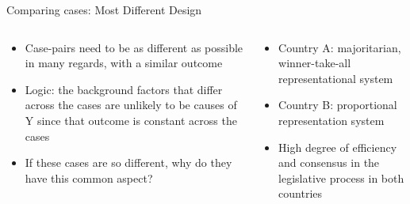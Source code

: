 \documentclass[10pt, aspectratio=169]{beamer}
\begin{document}
    
\begin{frame}{Comparing cases: Most Different Design}
    \begin{columns}
        \begin{column}{0.5\textwidth}
            \begin{itemize}
                \item Case-pairs need to be as different as possible in many regards, with a similar outcome\vspace{0.3cm}
                \item Logic: the background factors that differ across the cases are unlikely to be causes of Y since that outcome is constant across the cases\vspace{0.3cm}
                \item If these cases are so different, why do they have this common aspect?
            \end{itemize}
        \end{column}
        \vline
        \begin{column}{0.5\textwidth}
            \begin{itemize}
                \item Country A: majoritarian, winner-take-all representational system\vspace{0.3cm}
                \item Country B: proportional representation system\vspace{0.3cm}
                \item High degree of efficiency and consensus in the legislative process in both countries               
            \end{itemize}
        \end{column}
    \end{columns}

\end{frame}
\end{document}
